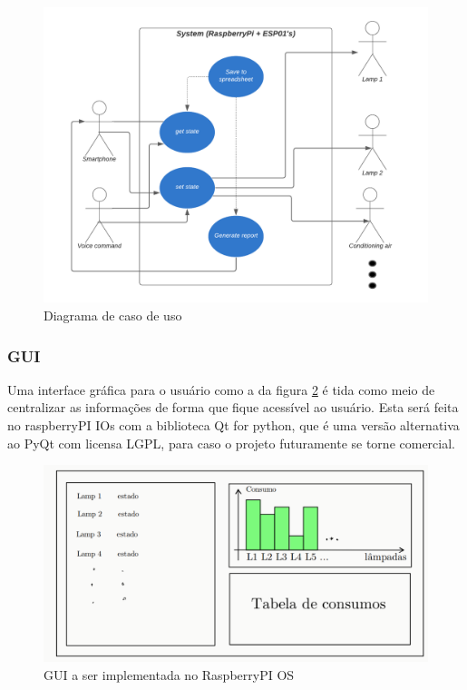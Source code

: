 \documentclass[11pt]{article}
\begin{document}
\begin{figure}[h!]
\caption{\label{fig:caso_de_uso}Diagrama de caso de uso}
\centering
\includegraphics[width=\textwidth]{diagrama_uso.png}
\end{figure}


\subsubsection{GUI}
\label{sec:org7b097fe}
Uma interface gráfica para o usuário como a da figura \ref{fig:gui} é tida como meio de centralizar as informações de forma que fique acessível ao usuário. Esta será feita no raspberryPI IOs com a biblioteca Qt for python, que é uma versão alternativa ao PyQt com licensa LGPL, para caso o projeto futuramente se torne comercial.
\begin{figure}[h!]
\caption{\label{fig:gui}GUI a ser implementada no RaspberryPI OS}
\centering
\includegraphics[width=\textwidth]{./gui.png}
\end{figure}
\end{document}
